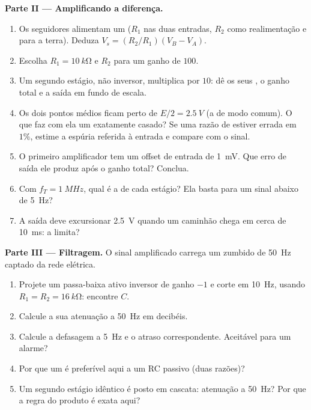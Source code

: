 \begin{problem}
\medskip
\noindent\textbf{Parte II --- Amplificando a diferença.}
\begin{enumerate}[resume]
  \item Os seguidores alimentam um  ($R_1$ nas duas
        entradas, $R_2$ como realimentação e para a terra). Deduza $V_s =
        (R_2/R_1)(V_B - V_A)$.
  \item Escolha $R_1 = \qty{10}{k\ohm}$ e $R_2$ para um ganho de $100$.
  \item Um segundo estágio, não inversor, multiplica por $10$: dê os seus
        , o ganho total e a saída em fundo de escala.
  \item Os dois pontos médios ficam perto de $E/2 = \qty{2.5}{V}$ (a 
        de modo comum). O que faz com ela um  exatamente
        casado? Se uma razão de  estiver errada em $1\%$, estime a
         espúria referida à entrada e compare com o sinal.
  \item O primeiro amplificador tem um offset de entrada de \qty{1}{mV}. Que erro
        de saída ele produz após o ganho total? Conclua.
  \item Com $f_T = \qty{1}{MHz}$, qual é a  de cada estágio?
        Ela basta para um sinal abaixo de \qty{5}{Hz}?
  \item A saída deve excursionar \qty{2.5}{V} quando um caminhão chega em
        cerca de \qty{10}{ms}: a  limita?
\end{enumerate}

\medskip
\noindent\textbf{Parte III --- Filtragem.}
O sinal amplificado carrega um zumbido de \qty{50}{Hz} captado da
rede elétrica.
\begin{enumerate}[resume]
  \item Projete um passa-baixa ativo inversor de ganho $-1$ e corte em
        \qty{10}{Hz}, usando $R_1 = R_2 = \qty{16}{k\ohm}$: encontre $C$.
  \item Calcule a sua atenuação a \qty{50}{Hz} em decibéis.
  \item Calcule a defasagem a \qty{5}{Hz} e o atraso
        correspondente. Aceitável para um alarme?
  \item Por que um  é preferível aqui a um RC passivo
        (duas razões)?
  \item Um segundo estágio idêntico é posto em cascata: atenuação a \qty{50}{Hz}?
        Por que a regra do produto é exata aqui?
\end{enumerate}


\end{problem}
